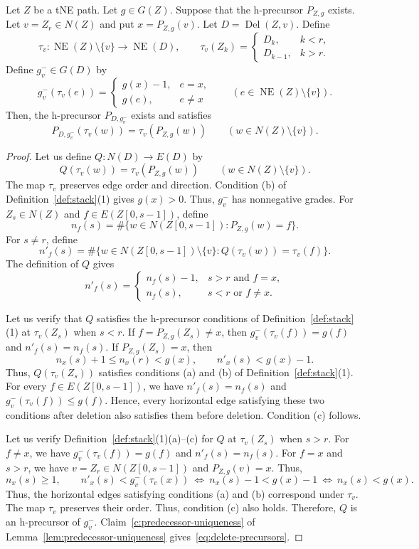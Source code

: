 \begin{lemma}\label{lem:delete-precursors}
Let $Z$ be a tNE path. Let $g\in G(Z)$.
Suppose that the h-precursor $P_{Z,g}$ exists.
Let $v=Z_r\in N(Z)$ and put $x=P_{Z,g}(v)$.
Let $D=\operatorname{Del}(Z,v)$.
Define
\[
 \tau_v\colon\operatorname{NE}(Z)\setminus\{v\}\longrightarrow\operatorname{NE}(D),
 \qquad
 \tau_v(Z_k)=\begin{cases}D_k,&k<r,\\D_{k-1},&k>r.\end{cases}
\]
Define $g_v^-\in G(D)$ by
\[
 g_v^-(\tau_v(e))=
 \begin{cases}g(x)-1,&e=x,\\g(e),&e\ne x\end{cases}
 \qquad(e\in\operatorname{NE}(Z)\setminus\{v\}).
\]
Then, the h-precursor $P_{D,g_v^-}$ exists and satisfies
\begin{equation}\label{eq:delete-precursors}
 P_{D,g_v^-}(\tau_v(w))=\tau_v(P_{Z,g}(w))
 \qquad(w\in N(Z)\setminus\{v\}).
\end{equation}
\end{lemma}
\begin{proof}
Let us define $Q\colon N(D)\to E(D)$ by
\[
 Q(\tau_v(w))=\tau_v(P_{Z,g}(w))
 \qquad(w\in N(Z)\setminus\{v\}).
\]
The map $\tau_v$ preserves edge order and direction.
Condition (b) of Definition~\ref{def:stack}(1) gives $g(x)>0$.
Thus, $g_v^-$ has nonnegative grades.
For $Z_s\in N(Z)$ and $f\in E(Z[0,s-1])$, define
\[
 n_f(s)=\#\{w\in N(Z[0,s-1]):P_{Z,g}(w)=f\}.
\]
For $s\ne r$, define
\[
 n'_f(s)=\#\{w\in N(Z[0,s-1])\setminus\{v\}:Q(\tau_v(w))=\tau_v(f)\}.
\]
The definition of $Q$ gives
\[
 n'_f(s)=
 \begin{cases}
 n_f(s)-1,&s>r\text{ and }f=x,\\
 n_f(s),&s<r\text{ or }f\ne x.
 \end{cases}
\]

Let us verify that $Q$ satisfies the h-precursor conditions of Definition~\ref{def:stack}(1) at $\tau_v(Z_s)$ when $s<r$.
If $f=P_{Z,g}(Z_s)\ne x$, then $g_v^-(\tau_v(f))=g(f)$ and $n'_f(s)=n_f(s)$.
If $P_{Z,g}(Z_s)=x$, then
\[
 n_x(s)+1\le n_x(r)<g(x),\qquad n'_x(s)<g(x)-1.
\]
Thus, $Q(\tau_v(Z_s))$ satisfies conditions (a) and (b) of Definition~\ref{def:stack}(1).
For every $f\in E(Z[0,s-1])$, we have $n'_f(s)=n_f(s)$ and
$g_v^-(\tau_v(f))\le g(f)$.
Hence, every horizontal edge satisfying these two conditions after deletion
also satisfies them before deletion. Condition (c) follows.

Let us verify Definition~\ref{def:stack}(1)(a)--(c) for $Q$ at $\tau_v(Z_s)$ when $s>r$.
For $f\ne x$, we have $g_v^-(\tau_v(f))=g(f)$ and $n'_f(s)=n_f(s)$.
For $f=x$ and $s>r$, we have $v=Z_r\in N(Z[0,s-1])$ and $P_{Z,g}(v)=x$. Thus,
\[
 n_x(s)\ge1,\qquad
 n'_x(s)<g_v^-(\tau_v(x))
 \ \Longleftrightarrow\ n_x(s)-1<g(x)-1
 \ \Longleftrightarrow\ n_x(s)<g(x).
\]
Thus, the horizontal edges satisfying conditions (a) and (b) correspond under $\tau_v$.
The map $\tau_v$ preserves their order. Thus, condition (c) also holds.
Therefore, $Q$ is an h-precursor of $g_v^-$.
Claim~\ref{c:predecessor-uniqueness} of Lemma~\ref{lem:predecessor-uniqueness}
gives~\eqref{eq:delete-precursors}.
\end{proof}

